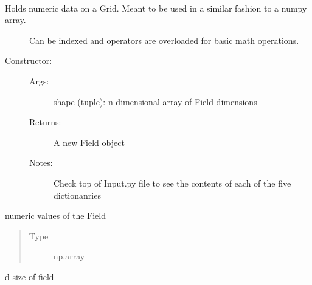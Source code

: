 \documentclass[letterpaper,10pt,english]{sphinxmanual}
\begin{document}
\begin{fulllineitems}
\label{\detokenize{autoapi/Field/index:Field.Field}}~\begin{description}
\item[{Holds numeric data on a Grid. Meant to be used in a similar fashion to a numpy array.}] \leavevmode
\sphinxAtStartPar
Can be indexed and operators are overloaded for basic math operations.

\item[{Constructor:}] \leavevmode\begin{description}
\item[{Args:}] \leavevmode
\sphinxAtStartPar
shape (tuple): n dimensional array of Field dimensions

\item[{Returns:}] \leavevmode
\sphinxAtStartPar
A new Field object

\item[{Notes:}] \leavevmode
\sphinxAtStartPar
Check top of Input.py file to see the contents of each of the five dictionanries

\end{description}

\end{description}

\begin{fulllineitems}
\label{\detokenize{autoapi/Field/index:Field.Field}}
\sphinxAtStartPar
numeric values of the Field
\begin{quote}\begin{description}
\item[{Type}] \leavevmode
\sphinxAtStartPar
np.array

\end{description}\end{quote}

\end{fulllineitems}


\begin{fulllineitems}
\label{\detokenize{autoapi/Field/index:Field.Field.size}}
\sphinxhyphen{}d size of field


\end{fulllineitems}
\end{fulllineitems}
\end{document}
